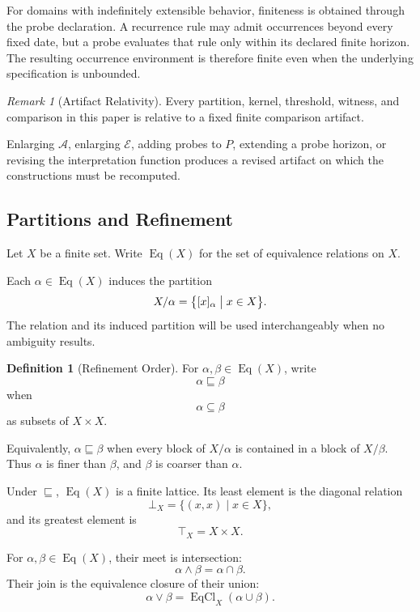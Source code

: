\documentclass[11pt]{article}
\theoremstyle{plain}
\theoremstyle{definition}
\newtheorem{definition}[theorem]{Definition}
\theoremstyle{remark}
\newtheorem{remark}[theorem]{Remark}
\begin{document}
For domains with indefinitely extensible behavior,
finiteness is obtained through the probe declaration.
A recurrence rule may admit occurrences beyond every fixed date,
but a probe evaluates that rule only within its declared finite horizon.
The resulting occurrence environment is therefore finite
even when the underlying specification is unbounded.

\begin{remark}[Artifact Relativity]
  \label{ik.rem.artifact-relative}
  Every partition,
  kernel,
  threshold,
  witness,
  and comparison in this paper
  is relative to a fixed finite comparison artifact.

  Enlarging \(\mathcal{A}\),
  enlarging \(\mathcal{E}\),
  adding probes to \(P\),
  extending a probe horizon,
  or revising the interpretation function
  produces a revised artifact
  on which the constructions must be recomputed.
\end{remark}

\subsection{Partitions and Refinement}

Let \(X\) be a finite set.
Write \(\operatorname{Eq}(X)\)
for the set of equivalence relations on \(X\).

Each \(\alpha\in\operatorname{Eq}(X)\)
induces the partition
\[
  X/\alpha
  =
  \bigl\{
  [x]_{\alpha}
  \bigm|
  x\in X
  \bigr\}.
\]
The relation and its induced partition
will be used interchangeably when no ambiguity results.

\begin{definition}[Refinement Order]
  \label{ik.def.refinement}
  For \(\alpha,\beta\in\operatorname{Eq}(X)\),
  write
  \[
    \alpha\sqsubseteq\beta
  \]
  when
  \[
    \alpha\subseteq\beta
  \]
  as subsets of \(X\times X\).

  Equivalently,
  \(\alpha\sqsubseteq\beta\)
  when every block of \(X/\alpha\)
  is contained in a block of \(X/\beta\).
  Thus \(\alpha\) is finer than \(\beta\),
  and \(\beta\) is coarser than \(\alpha\).
\end{definition}

Under \(\sqsubseteq\),
\(\operatorname{Eq}(X)\) is a finite lattice.
Its least element is the diagonal relation
\[
  \bot_X
  =
  \{
  (x,x)
  \mid
  x\in X
  \},
\]
and its greatest element is
\[
  \top_X
  =
  X\times X.
\]

For \(\alpha,\beta\in\operatorname{Eq}(X)\),
their meet is intersection:
\[
  \alpha\wedge\beta
  =
  \alpha\cap\beta.
\]
Their join is the equivalence closure of their union:
\[
  \alpha\vee\beta
  =
  \operatorname{EqCl}_X(\alpha\cup\beta).
\]
\end{document}
